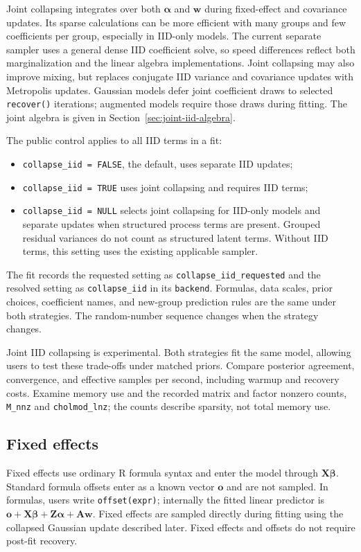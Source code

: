 \documentclass[11pt]{article}
\newcommand{\bw}{\bm{w}}
\newcommand{\balpha}{\bm{\alpha}}
\newcommand{\bbeta}{\bm{\beta}}
\newcommand{\bo}{\bm{o}}
\newcommand{\bA}{\bm{A}}
\newcommand{\bX}{\bm{X}}
\newcommand{\bZ}{\bm{Z}}
\begin{document}
Joint collapsing integrates over both $\balpha$ and $\bw$ during fixed-effect and
covariance updates. Its sparse calculations can be more efficient with many
groups and few coefficients per group, especially in IID-only models. The
current separate sampler uses a general dense IID coefficient solve, so speed
differences reflect both marginalization and the linear algebra implementations.
Joint collapsing may also improve mixing, but replaces conjugate IID variance
and covariance updates with Metropolis updates. Gaussian models defer joint
coefficient draws to selected \texttt{recover()} iterations; augmented models
require those draws during fitting. The joint algebra is given in
Section~\ref{sec:joint-iid-algebra}.

The public control applies to all IID terms in a fit:
\begin{itemize}
\item \texttt{collapse\_iid = FALSE}, the default, uses separate IID updates;
\item \texttt{collapse\_iid = TRUE} uses joint collapsing and requires IID terms;
\item \texttt{collapse\_iid = NULL} selects joint collapsing for IID-only models
and separate updates when structured process terms are present. Grouped residual
variances do not count as structured latent terms. Without IID terms, this setting
uses the existing applicable sampler.
\end{itemize}
The fit records the requested setting as \texttt{collapse\_iid\_requested}
and the resolved setting as \texttt{collapse\_iid} in its \texttt{backend}.
Formulas, data scales, prior choices, coefficient names, and new-group prediction
rules are the same under both strategies. The random-number sequence changes
when the strategy changes.

Joint IID collapsing is experimental. Both strategies fit the same model,
allowing users to test these trade-offs under matched priors. Compare posterior
agreement, convergence, and effective samples per second, including warmup and
recovery costs. Examine memory use and the recorded matrix and factor nonzero
counts, \texttt{M\_nnz} and \texttt{cholmod\_lnz}; the counts describe sparsity,
not total memory use.

\subsection{Fixed effects}

Fixed effects use ordinary R formula syntax and enter the model through $\bX\bbeta$. Standard formula offsets enter as a known vector $\bo$ and are not sampled. In formulas, users write \texttt{offset(expr)}; internally the fitted linear predictor is $\bo+\bX\bbeta+\bZ\balpha+\bA\bw$. Fixed effects are sampled directly during fitting using the collapsed Gaussian update described later. Fixed effects and offsets do not require post-fit recovery.
\end{document}
